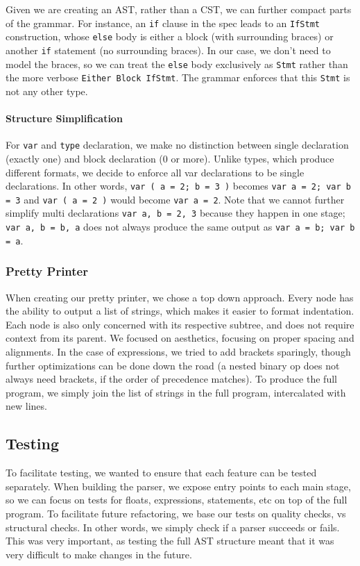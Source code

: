 \documentclass[11pt]{article}
\begin{document}
Given we are creating an AST, rather than a CST, we can further
compact parts of the grammar. For instance, an \texttt{if} clause in
the spec leads to an \texttt{IfStmt} construction, whose \texttt{else}
body is either a block (with surrounding braces) or another
\texttt{if} statement (no surrounding braces). In our case, we don't
need to model the braces, so we can treat the \texttt{else} body
exclusively as \texttt{Stmt} rather than the more verbose
\texttt{Either Block IfStmt}. The grammar enforces that this
\texttt{Stmt} is not any other type.
\paragraph{Structure Simplification}
For \texttt{var} and \texttt{type} declaration, we make no distinction
between single declaration (exactly one) and block declaration (0 or
more). Unlike types, which produce different formats, we decide to
enforce all var declarations to be single declarations. In other
words, \texttt{var ( a = 2; b = 3 )} becomes \texttt{var a = 2; var b = 3}
and \texttt{var ( a = 2 )} would become \texttt{var a = 2}. Note
that we cannot further simplify multi declarations \texttt{var a, b
  = 2, 3} because they happen in one stage;
  \texttt{var a, b = b, a} does not always produce the same output as
  \texttt{var a = b; var b = a}.

\subsubsection{Pretty Printer}
When creating our pretty printer, we chose a top down approach.  Every
node has the ability to output a list of strings, which makes it
easier to format indentation. Each node is also only concerned with
its respective subtree, and does not require context from its
parent. We focused on aesthetics, focusing on proper spacing and
alignments. In the case of expressions, we tried to add brackets
sparingly, though further optimizations can be done down the road (a
nested binary op does not always need brackets, if the order of
precedence matches). To produce the full program, we simply join the
list of strings in the full program, intercalated with new lines.

\subsection{Testing}

To facilitate testing, we wanted to ensure that each feature can
be tested separately.
When building the parser, we expose entry points to each main stage,
so we can focus on tests for floats, expressions, statements, etc
on top of the full program.
To facilitate future refactoring, we base our tests on quality checks, vs structural checks.
In other words, we simply check if a parser succeeds or fails.
This was very important, as testing the full AST structure meant that
it was very difficult to make changes in the future.
\end{document}

